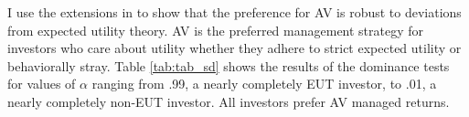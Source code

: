I use the extensions in \citet{vinod_generalized_2016} to show that the preference for AV is robust to deviations from expected utility theory. AV is the preferred management strategy for investors who care about utility whether they adhere to strict expected utility or behaviorally stray. Table \ref{tab:tab_sd} shows the results of the dominance tests for values of $\alpha$ ranging from .99, a nearly completely EUT investor, to .01, a nearly completely non-EUT investor. All investors prefer AV managed returns.

